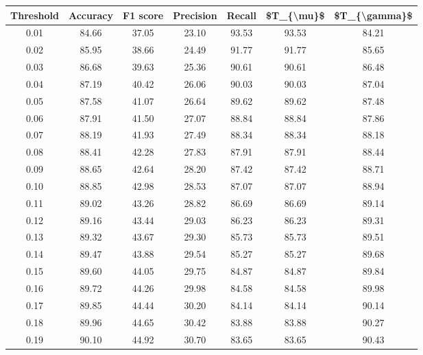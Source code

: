 \begin{tabular}{|c|c|c|c|c|c|c|}
\hline
 Threshold &  Accuracy &  F1 score &  Precision &  Recall &  \$T\_\{\textbackslash mu\}\$ &  \$T\_\{\textbackslash gamma\}\$ \\
\hline
      0.01 &     84.66 &     37.05 &      23.10 &   93.53 &      93.53 &         84.21 \\
      0.02 &     85.95 &     38.66 &      24.49 &   91.77 &      91.77 &         85.65 \\
      0.03 &     86.68 &     39.63 &      25.36 &   90.61 &      90.61 &         86.48 \\
      0.04 &     87.19 &     40.42 &      26.06 &   90.03 &      90.03 &         87.04 \\
      0.05 &     87.58 &     41.07 &      26.64 &   89.62 &      89.62 &         87.48 \\
      0.06 &     87.91 &     41.50 &      27.07 &   88.84 &      88.84 &         87.86 \\
      0.07 &     88.19 &     41.93 &      27.49 &   88.34 &      88.34 &         88.18 \\
      0.08 &     88.41 &     42.28 &      27.83 &   87.91 &      87.91 &         88.44 \\
      0.09 &     88.65 &     42.64 &      28.20 &   87.42 &      87.42 &         88.71 \\
      0.10 &     88.85 &     42.98 &      28.53 &   87.07 &      87.07 &         88.94 \\
      0.11 &     89.02 &     43.26 &      28.82 &   86.69 &      86.69 &         89.14 \\
      0.12 &     89.16 &     43.44 &      29.03 &   86.23 &      86.23 &         89.31 \\
      0.13 &     89.32 &     43.67 &      29.30 &   85.73 &      85.73 &         89.51 \\
      0.14 &     89.47 &     43.88 &      29.54 &   85.27 &      85.27 &         89.68 \\
      0.15 &     89.60 &     44.05 &      29.75 &   84.87 &      84.87 &         89.84 \\
      0.16 &     89.72 &     44.26 &      29.98 &   84.58 &      84.58 &         89.98 \\
      0.17 &     89.85 &     44.44 &      30.20 &   84.14 &      84.14 &         90.14 \\
      0.18 &     89.96 &     44.65 &      30.42 &   83.88 &      83.88 &         90.27 \\
      0.19 &     90.10 &     44.92 &      30.70 &   83.65 &      83.65 &         90.43 \\

\end{tabular}
